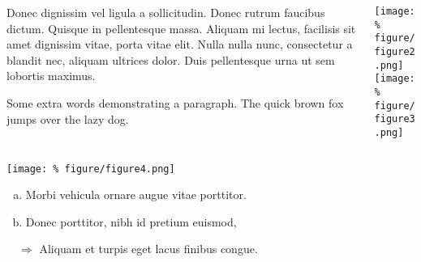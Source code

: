 \documentclass[unknownkeysallowed,usepdftitle=false, aspectratio=169, parskip=full]{beamer}
\newcommand{\secvariable}{nothing}
\newcommand{\mysection}[1]{\renewcommand{\secvariable}{#1}
}
\begin{document}
\mysection{radar}
\begin{frame}\label{\secvariable}
  \begin{columns}[t]
    \begin{column}[c]{0.45\textwidth}
    \parbox{\linewidth}{

      Donec dignissim vel ligula a sollicitudin. Donec rutrum faucibus dictum. Quisque in pellentesque massa. Aliquam mi lectus, facilisis sit amet dignissim vitae, porta vitae elit. Nulla nulla nunc, consectetur a blandit nec, aliquam ultrices dolor. Duis pellentesque urna ut sem lobortis maximus.
      
      \vspace{12pt}
      
	  Some extra words demonstrating a paragraph. The quick brown fox jumps over the lazy dog.
      }
    \end{column}
    \begin{column}[c]{0.45\textwidth}
\texttt{[image: \%
figure/figure2.png]}\\
\vspace{12pt}
\texttt{[image: \%
figure/figure3.png]}
    \end{column}
  \end{columns}

  
\end{frame}

\mysection{line}
\begin{frame}\label{\secvariable}
\begin{center}
  \vspace{-0.5cm}
 \texttt{[image: \%
  figure/figure4.png]}
\end{center}
  \vspace{-0.5cm}
  \begin{enumerate}[(a)]
  
  
  \item Morbi vehicula ornare augue vitae porttitor.
  \item Donec porttitor, nibh id pretium euismod,
  \end{enumerate}

  $\quad \Rightarrow$ Aliquam et turpis eget lacus finibus congue.
  
\end{frame}
\end{document}

